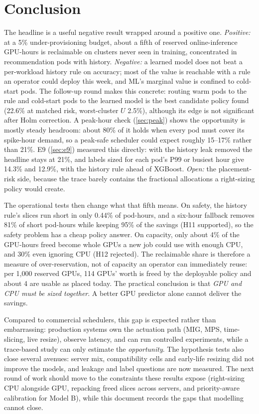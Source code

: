 \documentclass[11pt]{article}
\begin{document}
\section{Conclusion}
\label{sec:conclusion}

The headline is a useful negative result wrapped around a positive one. \emph{Positive:} at a 5\% under-provisioning budget, about a fifth of reserved online-inference GPU-hours is reclaimable on clusters never seen in training, concentrated in recommendation pods with history. \emph{Negative:} a learned model does not beat a per-workload history rule on accuracy; most of the value is reachable with a rule an operator could deploy this week, and ML's marginal value is confined to cold-start pods. The follow-up round makes this concrete: routing warm pods to the rule and cold-start pods to the learned model is the best candidate policy found (22.6\% at matched risk, worst-cluster $U$ 2.5\%), although its edge is not significant after Holm correction. A peak-hour check (\cref{sec:peak}) shows the opportunity is mostly steady headroom: about 80\% of it holds when every pod must cover its spike-hour demand, so a peak-safe scheduler could expect roughly 15--17\% rather than 21\%. E9 (\cref{sec:e9}) measured this directly: with the history leak removed the headline stays at 21\%, and labels sized for each pod's P99 or busiest hour give 14.3\% and 12.9\%, with the history rule ahead of XGBoost. \emph{Open:} the placement-risk side, because the trace barely contains the fractional allocations a right-sizing policy would create.

The operational tests then change what that fifth means. On safety, the history rule's slices run short in only 0.44\% of pod-hours, and a six-hour fallback removes 81\% of short pod-hours while keeping 95\% of the savings (H11 supported), so the safety problem has a cheap policy answer. On capacity, only about 4\% of the GPU-hours freed become whole GPUs a new job could use with enough CPU, and 30\% even ignoring CPU (H12 rejected). The reclaimable share is therefore a measure of over-reservation, not of capacity an operator can immediately reuse: per 1{,}000 reserved GPUs, 114 GPUs' worth is freed by the deployable policy and about 4 are usable as placed today. The practical conclusion is that \emph{GPU and CPU must be sized together}. A better GPU predictor alone cannot deliver the savings.

Compared to commercial schedulers, this gap is expected rather than embarrassing: production systems own the actuation path (MIG, MPS, time-slicing, live resize), observe latency, and can run controlled experiments, while a trace-based study can only estimate the \emph{opportunity}. The hypothesis tests also close several avenues: server mix, compatibility cells and early-life resizing did not improve the models, and leakage and label questions are now measured. The next round of work should move to the constraints these results expose (right-sizing CPU alongside GPU, repacking freed slices across servers, and priority-aware calibration for Model B), while this document records the gaps that modelling cannot close.
\end{document}

